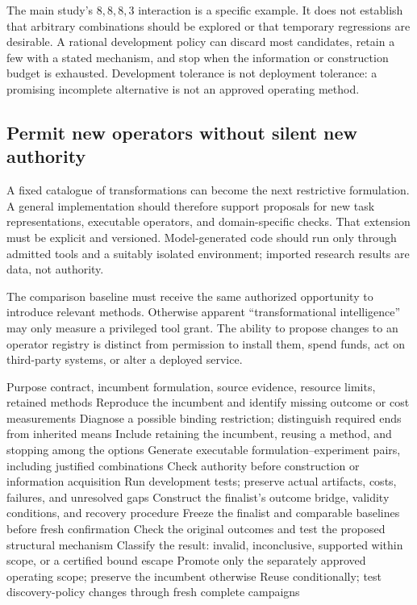 \documentclass[11pt,letterpaper]{article}
\theoremstyle{remark}\newtheorem{remark}{Remark}[section]
\begin{document}
The main study's $8,8,8,3$ interaction is a specific example. It does not establish that arbitrary combinations should be explored or that temporary regressions are desirable. A rational development policy can discard most candidates, retain a few with a stated mechanism, and stop when the information or construction budget is exhausted. Development tolerance is not deployment tolerance: a promising incomplete alternative is not an approved operating method.

\subsection{Permit new operators without silent new authority}
A fixed catalogue of transformations can become the next restrictive formulation. A general implementation should therefore support proposals for new task representations, executable operators, and domain-specific checks. That extension must be explicit and versioned. Model-generated code should run only through admitted tools and a suitably isolated environment; imported research results are data, not authority.

The comparison baseline must receive the same authorized opportunity to introduce relevant methods. Otherwise apparent ``transformational intelligence'' may only measure a privileged tool grant. The ability to propose changes to an operator registry is distinct from permission to install them, spend funds, act on third-party systems, or alter a deployed service.

\begin{algorithm}[htbp]
\caption{Discover a better formulation and establish its scope}
\label{alg:discovery}
\small
\begin{algorithmic}[1]
\Require Purpose contract, incumbent formulation, source evidence, resource limits, retained methods
\State Reproduce the incumbent and identify missing outcome or cost measurements
\State Diagnose a possible binding restriction; distinguish required ends from inherited means
\State Include retaining the incumbent, reusing a method, and stopping among the options
\State Generate executable formulation--experiment pairs, including justified combinations
  \State Check authority before construction or information acquisition
  \State Run development tests; preserve actual artifacts, costs, failures, and unresolved gaps
\EndFor
\State Construct the finalist's outcome bridge, validity conditions, and recovery procedure
\State Freeze the finalist and comparable baselines before fresh confirmation
\State Check the original outcomes and test the proposed structural mechanism
\State Classify the result: invalid, inconclusive, supported within scope, or a certified bound escape
\State Promote only the separately approved operating scope; preserve the incumbent otherwise
\State Reuse conditionally; test discovery-policy changes through fresh complete campaigns
\end{algorithmic}
\end{algorithm}
\end{document}
